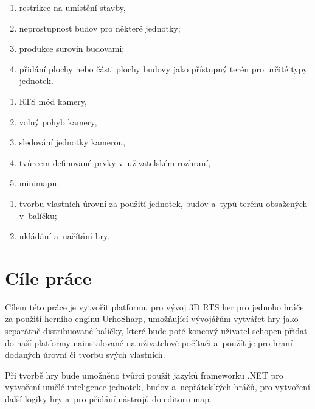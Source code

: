 \begin{enumerate}
	\item restrikce na umístění stavby,
	\item neprostupnost budov pro některé jednotky;
	\item produkce surovin budovami;
	\item přidání plochy nebo části plochy budovy jako přístupný terén pro určité typy jednotek.
\end{enumerate}

\begin{enumerate}
	\item RTS mód kamery,
	\item volný pohyb kamery,
	\item sledování jednotky kamerou,
	\item tvůrcem definované prvky v~uživatelském rozhraní,
	\item minimapu.
\end{enumerate}

\begin{enumerate}
	\item tvorbu vlastních úrovní za použití jednotek, budov a~typů terénu obsažených v~balíčku;
	\item ukládání a~načítání hry.
\end{enumerate}

\section{Cíle práce}
\label{sec:cileprace}
Cílem této práce je vytvořit platformu pro vývoj 3D RTS her pro jednoho hráče za použití herního enginu UrhoSharp, umožňující vývojářům vytvářet hry jako separátně 
distribuované balíčky, které bude poté koncový uživatel schopen přidat do naší platformy nainstalované na uživatelově počítači a~použít je pro hraní dodaných úrovní či tvorbu svých vlastních.

Při tvorbě hry bude umožněno tvůrci použít jazyků frameworku .NET  pro vytvoření umělé inteligence jednotek, budov a~nepřátelských hráčů, pro vytvoření další logiky hry a~pro přidání nástrojů do editoru map. 

